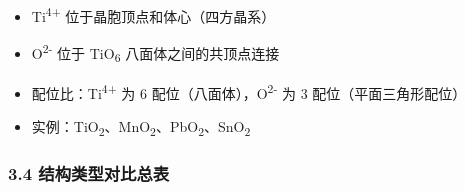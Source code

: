 \begin{itemize}
\tightlist
\item
  Ti\textsuperscript{4+} 位于晶胞顶点和体心（四方晶系）
\item
  O\textsuperscript{2-} 位于 TiO\textsubscript{6} 八面体之间的共顶点连接
\item
  配位比：Ti\textsuperscript{4+} 为 6 配位（八面体），O\textsuperscript{2-} 为 3 配位（平面三角形配位）
\item
  实例：TiO\textsubscript{2}、MnO\textsubscript{2}、PbO\textsubscript{2}、SnO\textsubscript{2}
\end{itemize}

\subsubsection{3.4 结构类型对比总表}\label{ux7ed3ux6784ux7c7bux578bux5bf9ux6bd4ux603bux8868}

